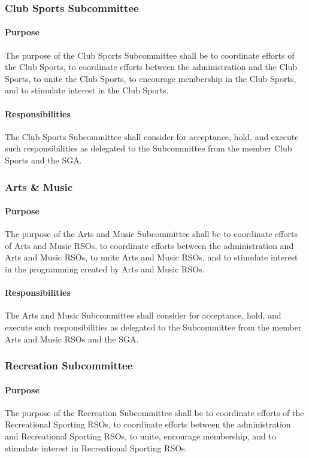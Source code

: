 \documentclass[12pt]{scrreprt}
\begin{document}
\subsubsection{Club Sports Subcommittee}

\paragraph{Purpose}
The purpose of the Club Sports Subcommittee shall be to coordinate efforts of
the Club Sports, to coordinate efforts between the administration and the Club Sports, to
unite the Club Sports, to encourage membership in the Club Sports, and to stimulate
interest in the Club Sports.

\paragraph{Responsibilities}
​The Club Sports Subcommittee shall consider for acceptance, hold,
and execute such responsibilities as delegated to the Subcommittee from the member Club
Sports and the SGA.

\subsubsection{Arts \& Music}

\paragraph{Purpose}
The purpose of the Arts and Music Subcommittee shall be to coordinate efforts
of Arts and Music RSOs, to coordinate efforts between the administration and Arts and
Music RSOs, to unite Arts and Music RSOs, and to stimulate interest in the programming
created by Arts and Music RSOs.

\paragraph{Responsibilities}
​The Arts and Music Subcommittee shall consider for acceptance, hold,
and execute such responsibilities as delegated to the Subcommittee from the member Arts
and Music RSOs and the SGA.

\subsubsection{Recreation Subcommittee}

\paragraph{Purpose}
​The purpose of the Recreation Subcommittee shall be to coordinate efforts of
the Recreational Sporting RSOs, to coordinate efforts between the administration and
Recreational Sporting RSOs, to unite, encourage membership, and to stimulate interest in
Recreational Sporting RSOs.
\end{document}
